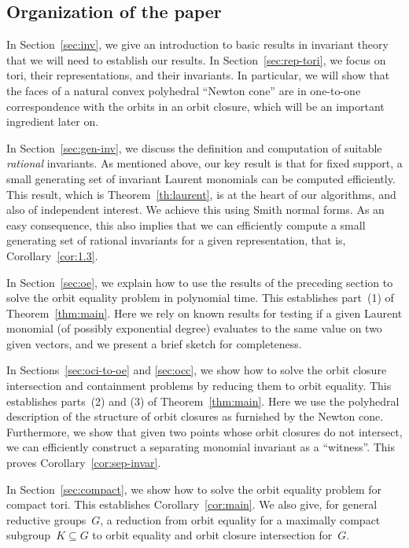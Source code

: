 %
%
%
%
%
%
%
%
%

%
\subsection{Organization of the paper}\label{subsec:organization}
%
In Section~\ref{sec:inv}, we give an introduction to basic results in invariant theory that we will need to establish our results.
In Section~\ref{sec:rep-tori}, we focus on tori, their representations, and their invariants.
In particular, we will show that the faces of a natural convex polyhedral ``Newton cone'' are in one-to-one correspondence with the orbits in an orbit closure, which will be an important ingredient later on.

In Section~\ref{sec:gen-inv}, we discuss the definition and computation of suitable \emph{rational} invariants.
As mentioned above, our key result is that for fixed support, a small generating set of invariant Laurent monomials can be computed efficiently.
This result, which is Theorem~\ref{th:laurent}, is at the heart of our algorithms, and also of independent interest.
We achieve this using Smith normal forms.
As an easy consequence, this also implies that we can efficiently compute a small generating set of rational invariants for a given representation, that is, Corollary~\ref{cor:1.3}.

In Section~\ref{sec:oe}, we explain how to use the results of the preceding section to solve the orbit equality problem in polynomial time.
This establishes part~(1) of Theorem~\ref{thm:main}.
Here we rely on known results for testing if a given Laurent monomial (of possibly exponential degree) evaluates to the same value on two given vectors, and we present a brief sketch for completeness.

In Sections~\ref{sec:oci-to-oe} and \ref{sec:occ}, we show how to solve the orbit closure intersection and containment problems by reducing them to orbit equality.
This establishes parts~(2) and (3) of Theorem~\ref{thm:main}.
Here we use the polyhedral description of the structure of orbit closures as furnished by the Newton cone.
Furthermore, we show that given two points whose orbit closures do not intersect, we can efficiently construct a separating monomial invariant as a ``witness''.
This proves Corollary~\ref{cor:sep-invar}.

In Section~\ref{sec:compact}, we show how to solve the orbit equality problem for compact tori.
This establishes Corollary~\ref{cor:main}.
We also give, for general reductive groups~$G$, a reduction from orbit equality for a maximally compact subgroup~$K\subseteq G$ to orbit equality and orbit closure intersection for~$G$.

